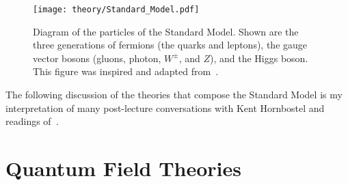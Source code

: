 \begin{figure}
 \centering
 \texttt{[image: theory/Standard\_Model.pdf]}
 \caption[Diagram of the particles of the Standard Model.]{%
  Diagram of the particles of the Standard Model.
  Shown are the three generations of fermions (the quarks and leptons), the gauge vector bosons (gluons, photon, $W^{\pm}$, and $Z$), and the Higgs boson.
  This figure was inspired and adapted from~\cite{web:Carsten_Burgard}.}
 \label{fig:Standard_Model}
\end{figure}

The following discussion of the theories that compose the Standard Model is my interpretation of many post-lecture conversations with Kent Hornbostel and readings of~\cite{Pich:2005mk}.

\section{Quantum Field Theories}\label{section:QFT}

